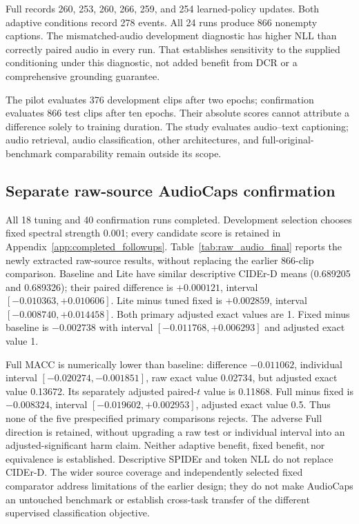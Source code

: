 \documentclass[10pt,a4paper,twocolumn]{article}
\begin{document}
Full records 260, 253, 260, 266, 259, and 254 learned-policy
updates. Both adaptive conditions record 278 events.
All 24 runs produce 866 nonempty captions.
The mismatched-audio development diagnostic has higher NLL
than correctly paired audio in every run.
That establishes sensitivity to the supplied conditioning
under this diagnostic, not added benefit from DCR or
a comprehensive grounding guarantee.

The pilot evaluates 376 development clips after two epochs;
confirmation evaluates 866 test clips after ten epochs.
Their absolute scores cannot attribute a difference solely
to training duration.
The study evaluates audio--text captioning; audio retrieval, audio classification,
other architectures, and full-original-benchmark comparability
remain outside its scope.



\subsection{Separate raw-source AudioCaps confirmation}
\label{sec:raw_audio_results}

All 18 tuning and 40 confirmation runs completed. Development selection
chooses fixed spectral strength 0.001; every candidate score is retained
in Appendix~\ref{app:completed_followups}. Table~\ref{tab:raw_audio_final}
reports the newly extracted raw-source results, without replacing the
earlier 866-clip comparison. Baseline and Lite have similar descriptive
CIDEr-D means (0.689205 and 0.689326); their paired difference is
$+0.000121$, interval $[-0.010363,+0.010606]$. Lite minus tuned fixed is
$+0.002859$, interval $[-0.008740,+0.014458]$. Both primary adjusted exact
values are 1. Fixed minus baseline is $-0.002738$ with interval
$[-0.011768,+0.006293]$ and adjusted exact value 1.

Full MACC is numerically lower than baseline: difference $-0.011062$,
individual interval $[-0.020274,-0.001851]$, raw exact value 0.02734,
but adjusted exact value 0.13672. Its separately adjusted paired-$t$
value is 0.11868. Full minus fixed is $-0.008324$, interval
$[-0.019602,+0.002953]$, adjusted exact value 0.5. Thus none of the five
prespecified primary comparisons rejects. The adverse Full direction is
retained, without upgrading a raw test or individual interval into an
adjusted-significant harm claim. Neither adaptive benefit, fixed benefit,
nor equivalence is established. Descriptive SPIDEr and token NLL do not
replace CIDEr-D. The wider source coverage and independently selected
fixed comparator address limitations of the earlier design; they do not
make AudioCaps an untouched benchmark or establish cross-task transfer
of the different supervised classification objective.
\end{document}

